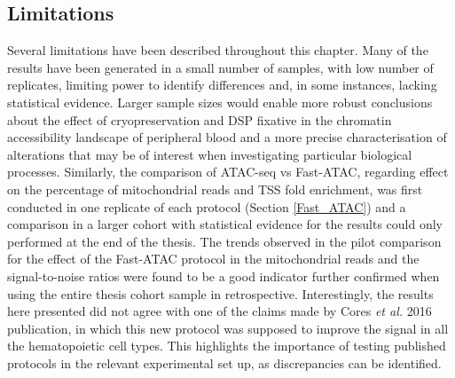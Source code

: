 

\subsection{Limitations}
Several limitations have been described throughout this chapter. Many of the results have been generated in a small number of samples, with low number of replicates, limiting power to identify differences and, in some instances, lacking statistical evidence. Larger sample sizes would enable more robust conclusions about the effect of cryopreservation and DSP fixative in the chromatin accessibility landscape of peripheral blood and a more precise characterisation of alterations that may be of interest when investigating particular biological processes. Similarly, the comparison of ATAC-seq vs Fast-ATAC, regarding effect on the percentage of mitochondrial reads and TSS fold enrichment, was first conducted in one replicate of each protocol (Section \ref{Fast_ATAC}) and a comparison in a larger cohort with statistical evidence for the results could only performed at the end of the thesis. The trends observed in the pilot comparison for the effect of the Fast-ATAC protocol in the mitochondrial reads and the signal-to-noise ratios were found to be a good indicator further confirmed when using the entire thesis cohort sample in retrospective. Interestingly, the results here presented did not agree with one of the claims made by Cores \textit{et al.} 2016 publication, in which this new protocol was supposed to improve the signal in all the hematopoietic cell types. This highlights the importance of testing published protocols in the relevant experimental set up, as discrepancies can be identified.  


